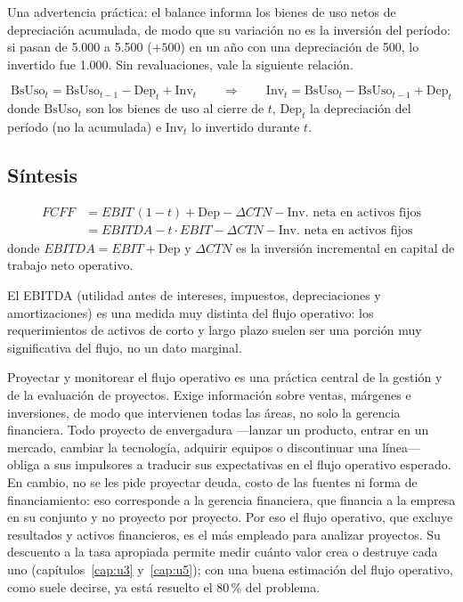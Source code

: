 Una advertencia práctica: el balance informa los bienes de uso netos de depreciación acumulada, de modo que su variación no es la inversión del período: si pasan de 5.000 a 5.500 ($+500$) en un año con una depreciación de 500, lo invertido fue 1.000. Sin revaluaciones, vale la siguiente relación.

\begin{formulaBox}
\[
\text{BsUso}_t = \text{BsUso}_{t-1} - \text{Dep}_t + \text{Inv}_t
\qquad\Longrightarrow\qquad
\text{Inv}_t = \text{BsUso}_t - \text{BsUso}_{t-1} + \text{Dep}_t
\]
donde $\text{BsUso}_t$ son los bienes de uso al cierre de $t$, $\text{Dep}_t$ la depreciación del período (no la acumulada) e $\text{Inv}_t$ lo invertido durante $t$.
\end{formulaBox}

\subsection{Síntesis}

\begin{formulaBox}
\[
\begin{aligned}
FCFF &= EBIT\,(1-t) + \text{Dep} - \Delta CTN - \text{Inv. neta en activos fijos}\\
     &= EBITDA - t\cdot EBIT - \Delta CTN - \text{Inv. neta en activos fijos}
\end{aligned}
\]
donde $EBITDA = EBIT + \text{Dep}$ y $\Delta CTN$ es la inversión incremental en capital de trabajo neto operativo.
\end{formulaBox}

El EBITDA (utilidad antes de intereses, impuestos, depreciaciones y amortizaciones) es una medida muy distinta del flujo operativo: los requerimientos de activos de corto y largo plazo suelen ser una porción muy significativa del flujo, no un dato marginal.

Proyectar y monitorear el flujo operativo es una práctica central de la gestión y de la evaluación de proyectos. Exige información sobre ventas, márgenes e inversiones, de modo que intervienen todas las áreas, no solo la gerencia financiera. Todo proyecto de envergadura —lanzar un producto, entrar en un mercado, cambiar la tecnología, adquirir equipos o discontinuar una línea— obliga a sus impulsores a traducir sus expectativas en el flujo operativo esperado. En cambio, no se les pide proyectar deuda, costo de las fuentes ni forma de financiamiento: eso corresponde a la gerencia financiera, que financia a la empresa en su conjunto y no proyecto por proyecto. Por eso el flujo operativo, que excluye resultados y activos financieros, es el más empleado para analizar proyectos. Su descuento a la tasa apropiada permite medir cuánto valor crea o destruye cada uno (capítulos~\ref{cap:u3} y~\ref{cap:u5}); con una buena estimación del flujo operativo, como suele decirse, ya está resuelto el 80\,\% del problema.


